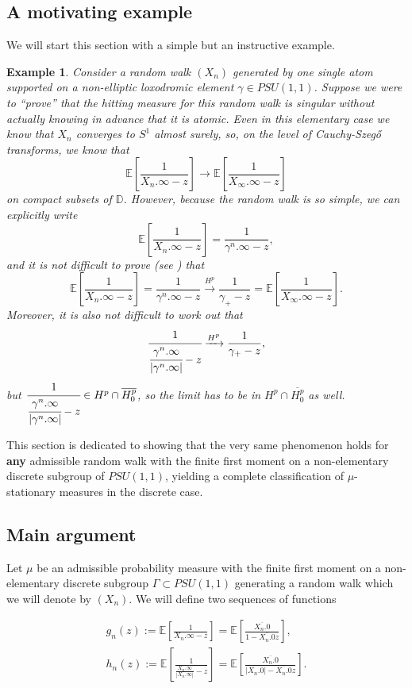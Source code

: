 \documentclass[11pt]{article}
\newtheorem{example}{Example}[section]
\begin{document}
\subsection{A motivating example}
We will start this section with a simple but an instructive example.
\begin{example}
	Consider a random walk $(X_n)$ generated by one single atom supported on a non-elliptic loxodromic element $\gamma \in PSU(1,1)$. Suppose we were to ``prove'' that the hitting measure for this random walk is singular without actually knowing in advance that it is atomic. Even in this elementary case we know that $X_n$ converges to $S^1$ almost surely, so, on the level of Cauchy-Szeg\H{o} transforms, we know that 
	\[
	\mathbb{E}\left[\frac{1}{X_n.\infty - z}\right] \rightarrow \mathbb{E}\left[\frac{1}{X_\infty.\infty - z}\right]
	\]
	on compact subsets of $\mathbb{D}$. However, because the random walk is so simple, we can explicitly write
	\[
	\mathbb{E}\left[\frac{1}{X_n.\infty - z}\right] = \frac{1}{\gamma^n.\infty - z},
	\]
	and it is not difficult to prove (see \cite[Lemma 6.2.23]{cimahardy}) that
	\[
	\mathbb{E}\left[\frac{1}{X_n.\infty - z}\right] = \frac{1}{\gamma^n.\infty - z} \xrightarrow{H^p} \frac{1}{\gamma_+ - z} = \mathbb{E}\left[\frac{1}{X_\infty.\infty - z}\right].
	\]
	Moreover, it is also not difficult to work out that
	\[
	\cfrac{1}{\cfrac{\gamma^n.\infty}{|\gamma^n.\infty|} - z} \xrightarrow{H^p} \frac{1}{\gamma_+ - z},
	\]
	but $\cfrac{1}{\cfrac{\gamma^n.\infty}{|\gamma^n.\infty|} - z} \in H^p \cap \overline{H^p_0}$, so the limit has to be in $H^p \cap \overline{H^p_0}$ as well.
\end{example}

This section is dedicated to showing that the very same phenomenon holds for \textbf{any} admissible random walk with the finite first moment on a non-elementary discrete subgroup of $PSU(1,1)$, yielding a complete classification of $\mu$-stationary measures in the discrete case.

\subsection{Main argument}


Let $\mu$ be an admissible probability measure with the finite first moment on a non-elementary discrete subgroup $\Gamma \subset PSU(1,1)$ generating a random walk which we will denote by $(X_n)$. We will define two sequences of functions

\begin{gather}
	g_n(z) := \mathbb{E} \left[\frac{1}{X_n.\infty - z}\right] = \mathbb{E} \left[\frac{\overline{X_n.0}}{1 - \overline{X_n.0} z}\right], \\
	h_n(z) := \mathbb{E} \left[\frac{1}{\frac{X_n.\infty}{|X_n.\infty|} - z}\right] = \mathbb{E} \left[\frac{\overline{X_n.0}}{|X_n.0| - \overline{X_n.0} z}\right].
\end{gather}
\end{document}
